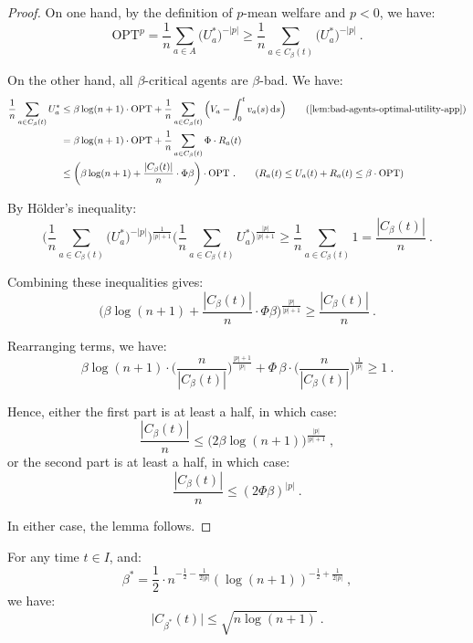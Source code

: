 \documentclass[11pt,letterpaper]{article}
\newcommand{\OPT}{\mathrm{OPT}}
\newcommand{\dif}[1]{\,\text{\rm d} #1}
\newcommand{\utility}{U}
\newcommand{\regularizer}{R}
\begin{document}
\begin{proof}    
	On one hand, by the definition of $p$-mean welfare and $p < 0$, we have:
	\[
	\OPT^p = \frac{1}{n} \sum_{a\in A} \big(\utility_a^*\big)^{-|p|} \ge \frac{1}{n} \sum_{a \in C_\beta(t)} \big(\utility_a^*\big)^{-|p|}
	~.
	\]
	
	On the other hand, all $\beta$-critical agents are $\beta$-bad.
	We have:
	\begin{align*}
		\frac{1}{n} \sum_{a \in C_\beta(t)} \utility_a^*
		&
		\leq \beta \log (n+1) \cdot \OPT + \frac{1}{n} \sum_{a \in C_\beta(t)} \Big( V_a - \int_0^t v_a(s) \dif{s} \Big)
		\tag{\Cref{lem:bad-agents-optimal-utility-app}} \\
		&
		= \beta \log (n+1) \cdot \OPT + \frac{1}{n} \sum_{a \in C_\beta(t)} \Phi \cdot \regularizer_a(t) \\
		&
		\le \bigg(\beta \log (n+1) + \frac{|C_\beta(t)|}{n} \cdot \Phi \beta \bigg) \cdot \OPT
		~.
		\tag{$\regularizer_a(t) \le \utility_a(t) + \regularizer_a(t) \le \beta \cdot \OPT$}
	\end{align*}
	
	By H\"{o}lder's inequality:
	\[
	\bigg( \frac{1}{n} \sum_{a \in C_\beta(t)} \big(\utility_a^*\big)^{-|p|} \bigg)^{\frac{1}{|p|+1}} \bigg( \frac{1}{n} \sum_{a \in C_\beta(t)} \utility_a^* \bigg)^{\frac{|p|}{|p|+1}} \ge \frac{1}{n} \sum_{a \in C_\beta(t)} 1 = \frac{|C_\beta(t)|}{n}
	~.
	\]
	
	Combining these inequalities gives:
	\[
	\bigg( \beta \log (n+1) + \frac{|C_\beta(t)|}{n} \cdot \Phi \beta \bigg)^{\frac{|p|}{|p|+1}} \ge \frac{|C_\beta(t)|}{n}
	~.
	\]
	
	Rearranging terms, we have:
	\[
	\beta \log (n+1) \cdot \bigg( \frac{n}{|C_\beta(t)|} \bigg)^{\frac{|p|+1}{|p|}} + \Phi\, \beta \cdot \bigg( \frac{n}{|C_\beta(t)|} \bigg)^{\frac{1}{|p|}} \ge 1
	~.
	\]
	
	Hence, either the first part is at least a half, in which case:
	\[
	\frac{|C_\beta(t)|}{n} \le \big(2 \beta \log(n+1) \big)^{\frac{|p|}{|p|+1}}
	~,
	\]
	or the second part is at least a half, in which case:
	\[
	\frac{|C_\beta(t)|}{n} \le (2\Phi\beta)^{|p|}
	~.
	\]
	
	In either case, the lemma follows.
\end{proof}

\begin{corollary}
	\label{cor:critical-threshold-app}
	For any time $t \in I$, and:
	\begin{equation}
		\label{eq:beta-star-app}
		\beta^* = \frac{1}{2} \cdot  n^{-\frac{1}{2}-\frac{1}{2|p|}} (\log (n+1))^{-\frac{1}{2}+\frac{1}{2|p|}}
		~,	
	\end{equation}
	we have:
	\[
	\big|C_{\beta^*} (t)\big| \le \sqrt{n \log (n+1)}
	~.
	\]
\end{corollary}
\end{document}

